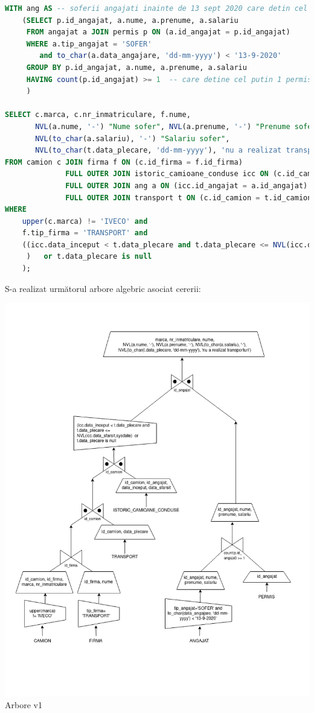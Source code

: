 \documentclass[12pt, a4paper]{article}
\begin{document}
\begin{lstlisting}[language=SQL]
WITH ang AS -- soferii angajati inainte de 13 sept 2020 care detin cel mult 2 permise auto
    (SELECT p.id_angajat, a.nume, a.prenume, a.salariu
     FROM angajat a JOIN permis p ON (a.id_angajat = p.id_angajat)
     WHERE a.tip_angajat = 'SOFER'
        and to_char(a.data_angajare, 'dd-mm-yyyy') < '13-9-2020' 
     GROUP BY p.id_angajat, a.nume, a.prenume, a.salariu
     HAVING count(p.id_angajat) >= 1  -- care detine cel putin 1 permis  
     )

SELECT c.marca, c.nr_inmatriculare, f.nume, 
       NVL(a.nume, '-') "Nume sofer", NVL(a.prenume, '-') "Prenume sofer", 
       NVL(to_char(a.salariu), '-') "Salariu sofer",
       NVL(to_char(t.data_plecare, 'dd-mm-yyyy'), 'nu a realizat transporturi') "Data transport"
FROM camion c JOIN firma f ON (c.id_firma = f.id_firma)
              FULL OUTER JOIN istoric_camioane_conduse icc ON (c.id_camion = icc.id_camion)
              FULL OUTER JOIN ang a ON (icc.id_angajat = a.id_angajat)
              FULL OUTER JOIN transport t ON (c.id_camion = t.id_camion)
WHERE
    upper(c.marca) != 'IVECO' and
    f.tip_firma = 'TRANSPORT' and 
    ((icc.data_inceput < t.data_plecare and t.data_plecare <= NVL(icc.data_sfarsit, sysdate)
     )   or t.data_plecare is null
    );
\end{lstlisting}

\newpage
S-a realizat următorul arbore algebric asociat cererii:

\includegraphics[width=\textwidth]{arbore_v1.png}
\label{arbore_v1}
\centering Arbore v1
\end{document}
